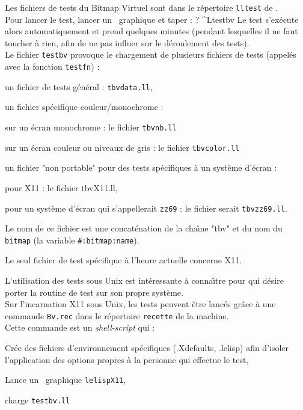 Les fichiers de tests du Bitmap Virtuel sont dans le r\'{e}pertoire {\tt lltest}
de \LeLisp.\\
Pour lancer le test, lancer un \LeLisp\ graphique et taper :
\BeginLL
? ^Ltestbv
\EndLL
Le test s'ex\'{e}cute alors automatiquement et prend quelques minutes (pendant
lesquelles il ne faut toucher \`{a} rien, afin de ne pas influer
sur le d\'{e}roulement des tests).\\
Le fichier {\tt testbv} provoque le chargement de plusieurs fichiers de tests
(appel\'{e}s avec la fonction {\tt testfn}) :
\begin {Itemize}
\item un fichier de tests g\'{e}n\'{e}ral : {\tt tbvdata.ll},
\item un fichier sp\'{e}cifique couleur/monochrome :
\begin {Itemize}
\item sur un \'{e}cran monochrome : le fichier {\tt tbvnb.ll}
\item sur un \'{e}cran couleur ou niveaux de gris : le fichier {\tt tbvcolor.ll}
\end {Itemize}
\item un fichier "non portable" pour des tests sp\'{e}cifiques \`{a} un syst\`{e}me
d'\'{e}cran :
\begin {Itemize}
\item pour X11 : le fichier tbvX11.ll,
\item pour un syst\`{e}me d'\'{e}cran qui s'appellerait {\tt zz69} : le fichier
serait {\tt tbvzz69.ll}.
\end {Itemize}
Le nom de ce fichier est une concat\'{e}nation de la cha\^{\i}ne "tbv" et du nom du
{\tt bitmap} (la variable {\tt \#:bitmap:name}).
\end {Itemize}
Le seul fichier de test sp\'{e}cifique \`{a} l'heure actuelle concerne X11.


L'utilisation des tests sous Unix est int\'{e}ressante \`{a} conna\^{\i}tre pour qui
d\'{e}sire porter la routine de test sur son propre syst\`{e}me.\\
Sur l'incarnation X11 sous Unix, les tests peuvent \^{e}tre lanc\'{e}s gr\^{a}ce \`{a} une
commande {\tt Bv.rec} dans le r\'{e}pertoire {\tt recette} de la machine.\\
Cette commande est un {\em shell-script} qui :
\begin {Itemize}
\item Cr\'{e}e des fichiers d'environnement sp\'{e}cifiques (.Xdefaults, .lelisp)
afin d'isoler l'application des options propres \`{a} la personne
qui effectue le test,
\item Lance un \LeLisp\ graphique {\tt lelispX11},
\item charge {\tt testbv.ll}
\end {Itemize}

